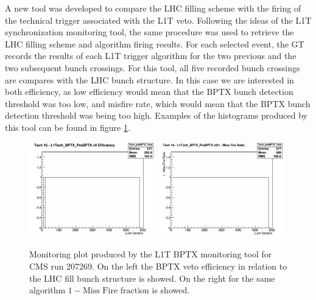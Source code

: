 A new tool was developed to compare the \gls{LHC} filling scheme with the firing of the technical trigger associated with the \gls{L1T} veto. Following the ideas of the \gls{L1T} synchronization monitoring tool, the same procedure was used to retrieve the \gls{LHC} filling scheme and algorithm firing results. For each selected event, the \gls{GT} records the results of each \gls{L1T} trigger algorithm for the two previous and the two subsequent bunch crossings. For this tool, all five recorded bunch crossings are compares with the \gls{LHC} bunch structure. In this case we are interested in both efficiency, as low efficiency would mean that the \gls{BPTX} bunch detection threshold was too low, and misfire rate, which would mean that the \gls{BPTX} bunch detection threshold was being too high. Examples of the histograms produced by this tool can be found in figure \ref{FIGURE:TechnicalWork_BPTXMonitoring}.

\begin{figure}[!htb]
\centering
\includegraphics[width=0.49\textwidth]{Chapter03/L1TOnline/Images/L1TDQM_Online_Run207269_L1TBPTX_Efficiency_Tech_preBPTX_Veto.png}
\includegraphics[width=0.49\textwidth]{Chapter03/L1TOnline/Images/L1TDQM_Online_Run207269_L1TBPTX_MissFire_Tech_preBPTX_Veto.png}
\caption{Monitoring plot produced by the \gls{L1T} \gls{BPTX} monitoring tool for \gls{CMS} run 207269. On the left the \gls{BPTX} veto efficiency in relation to the \gls{LHC} fill bunch structure is showed. On the right for the same algorithm $1 - \text{Miss Fire fraction}$ is showed.}
\label{FIGURE:TechnicalWork_BPTXMonitoring}
\end{figure}

